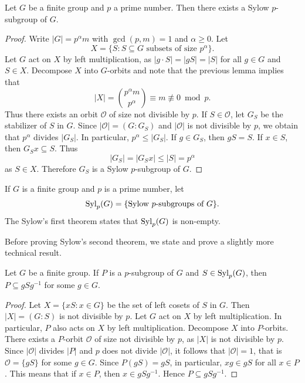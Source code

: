 \begin{theorem}
\label{thm:Sylow1}
Let $G$ be a finite group and 
$p$ a prime number. Then there exists a Sylow $p$-subgroup of $G$. 
\end{theorem}

\begin{proof}
Write $|G|=p^\alpha m$ with $\gcd(p,m)=1$ and $\alpha\geq0$. Let 
\[
X=\{S:S\subseteq G\text{ subsets of size $p^\alpha$}\}.
\]
Let $G$ act on $X$ by left multiplication, as $|g\cdot S|=|gS|=|S|$ for all $g\in G$ and $S\in X$. Decompose $X$
into $G$-orbits and note that the previous lemma
implies that 
\[
|X|= \binom{p^\alpha m}{p^\alpha}\equiv m\not\equiv 0\bmod p.
\]
Thus there exists an orbit $\mathcal{O}$ of size not divisible by $p$. 
If $S\in\mathcal{O}$, let $G_S$ be the stabilizer of $S$ in $G$. Since
$|\mathcal{O}|=(G:G_S)$ and $|\mathcal{O}|$ is not divisible by $p$, we obtain that $p^\alpha$ divides $|
G_S|$. In particular, $p^\alpha\leq |G_S|$. If $g\in G_S$, then
$gS=S$. If $x\in S$, then $G_Sx\subseteq S$. Thus 
\[
|G_S|=|G_Sx|\leq |S|=p^\alpha
\]
as $S\in X$. Therefore $G_S$ is a Sylow $p$-subgroup of $G$.
\end{proof}

If $G$ is a finite group and
$p$ is a prime number, 
let 
\[
\mathrm{Syl}_p(G)=\{\text{Sylow $p$-subgroups of $G$}\}.
\]
The Sylow's first theorem states that 
$\mathrm{Syl}_p(G)$ is non-empty. 

Before proving Sylow's second theorem, 
we state and prove a slightly more technical result. 

\begin{theorem}
\label{thm:Sylow_auxiliar}
Let $G$ be a finite group. 
If $P$ is a $p$-subgroup of $G$ and $S\in\mathrm{Syl}_p(G)$, then $P\subseteq gSg^{-1}$ for some $g\in G$.
\end{theorem}

\begin{proof}
    Let $X=\{xS:x\in G\}$ be the set of left cosets of $S$ in $G$. Then $|X|=(G:S)$ is not divisible by $p$. Let $G$ act on $X$ 
    by left multiplication. In particular, 
    $P$ also acts on $X$ by left multiplication. 
    Decompose $X$ into 
    $P$-orbits. There exists a $P$-orbit $\mathcal{O}$ of size
    not divisible by $p$, as $|X|$ is not divisible by $p$. Since  $|\mathcal{O}|$ divides $|P|$ and $p$ does not divide 
    $|\mathcal{O}|$, it follows that $|\mathcal{O}|=1$,
    that is $\mathcal{O}=\{gS\}$ for some
    $g\in G$. Since $P(gS)=gS$, in particular, $xg\in gS$ 
    for all $x\in P$. This means that if $x\in P$, then 
    $x\in gSg^{-1}$. Hence $P\subseteq gSg^{-1}$.
\end{proof}

